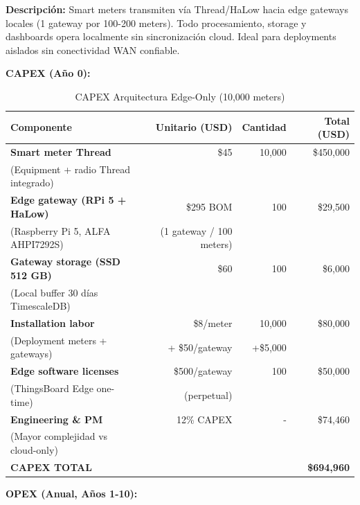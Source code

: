 \textbf{Descripción:} Smart meters transmiten vía Thread/HaLow hacia edge gateways locales (1 gateway por 100-200 meters). Todo procesamiento, storage y dashboards opera localmente sin sincronización cloud. Ideal para deployments aislados sin conectividad WAN confiable.

\textbf{CAPEX (Año 0):}

\begin{table}[H]
\centering
\caption{CAPEX Arquitectura Edge-Only (10,000 meters)}
\label{tab:capex-edge-only}
\small
\begin{tabular}{|p{5cm}|r|r|r|}
\hline
\rowcolor{green!20}
\textbf{Componente} & \textbf{Unitario (USD)} & \textbf{Cantidad} & \textbf{Total (USD)} \\
\hline
\textbf{Smart meter Thread} & \$45 & 10,000 & \$450,000 \\
(Equipment + radio Thread integrado) & & & \\
\hline
\textbf{Edge gateway (RPi 5 + HaLow)} & \$295 BOM & 100 & \$29,500 \\
(Raspberry Pi 5, ALFA AHPI7292S) & (1 gateway / 100 meters) & & \\
\hline
\textbf{Gateway storage (SSD 512 GB)} & \$60 & 100 & \$6,000 \\
(Local buffer 30 días TimescaleDB) & & & \\
\hline
\textbf{Installation labor} & \$8/meter & 10,000 & \$80,000 \\
(Deployment meters + gateways) & + \$50/gateway & +\$5,000 & \\
\hline
\textbf{Edge software licenses} & \$500/gateway & 100 & \$50,000 \\
(ThingsBoard Edge one-time) & (perpetual) & & \\
\hline
\textbf{Engineering \& PM} & 12\% CAPEX & - & \$74,460 \\
(Mayor complejidad vs cloud-only) & & & \\
\hline
\rowcolor{gray!20}
\textbf{CAPEX TOTAL} & & & \textbf{\$694,960} \\
\hline
\end{tabular}
\end{table}

\textbf{OPEX (Anual, Años 1-10):}

